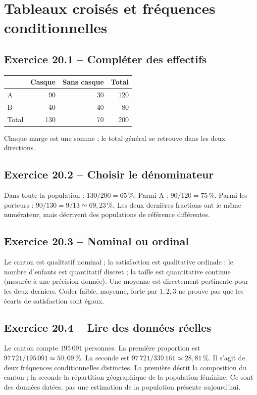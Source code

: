 \chapter{Tableaux croisés et fréquences conditionnelles}
\section*{Exercice 20.1 -- Compléter des effectifs}
\begin{center}\begin{tabular}{lrrr}\toprule & Casque & Sans casque & Total\\\midrule A & 90&30&120\\ B&40&40&80\\ Total&130&70&200\\\bottomrule\end{tabular}\end{center} Chaque marge est une somme ; le total général se retrouve dans les deux directions.

\section*{Exercice 20.2 -- Choisir le dénominateur}
Dans toute la population : $130/200=65\,\%$. Parmi A : $90/120=75\,\%$. Parmi les porteurs : $90/130=9/13\simeq69{,}23\,\%$. Les deux dernières fractions ont le même numérateur, mais décrivent des populations de référence différentes.

\section*{Exercice 20.3 -- Nominal ou ordinal}
Le canton est qualitatif nominal ; la satisfaction est qualitative ordinale ; le nombre d'enfants est quantitatif discret ; la taille est quantitative continue (mesurée à une précision donnée). Une moyenne est directement pertinente pour les deux derniers. Coder faible, moyenne, forte par $1,2,3$ ne prouve pas que les écarts de satisfaction sont égaux.

\section*{Exercice 20.4 -- Lire des données réelles}
Le canton compte $195\,091$ personnes. La première proportion est $97\,721/195\,091\simeq50{,}09\,\%$. La seconde est $97\,721/339\,161\simeq28{,}81\,\%$. Il s'agit de deux fréquences conditionnelles distinctes. La première décrit la composition du canton ; la seconde la répartition géographique de la population féminine. Ce sont des données datées, pas une estimation de la population présente aujourd'hui.

